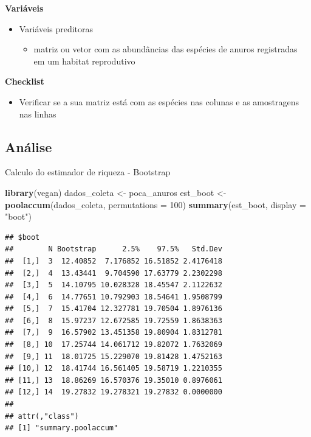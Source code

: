 \documentclass[
]{book}
\newenvironment{Shaded}{\begin{snugshade}}{\end{snugshade}}
\newcommand{\DataTypeTok}[1]{\textcolor[rgb]{0.13,0.29,0.53}{#1}}
\newcommand{\DecValTok}[1]{\textcolor[rgb]{0.00,0.00,0.81}{#1}}
\newcommand{\KeywordTok}[1]{\textcolor[rgb]{0.13,0.29,0.53}{\textbf{#1}}}
\newcommand{\NormalTok}[1]{#1}
\newcommand{\StringTok}[1]{\textcolor[rgb]{0.31,0.60,0.02}{#1}}
\providecommand{\tightlist}{%
  \setlength{\itemsep}{0pt}\setlength{\parskip}{0pt}}
\begin{document}
\textbf{Variáveis}

\begin{itemize}
\tightlist
\item
  Variáveis preditoras

  \begin{itemize}
  \tightlist
  \item
    matriz ou vetor com as abundâncias das espécies de anuros registradas em um habitat reprodutivo
  \end{itemize}
\end{itemize}

\textbf{Checklist}

\begin{itemize}
\tightlist
\item
  Verificar se a sua matriz está com as espécies nas colunas e as amostragens nas linhas
\end{itemize}

\hypertarget{anuxe1lise-5}{%
\subsection{Análise}\label{anuxe1lise-5}}

Calculo do estimador de riqueza - Bootstrap

\begin{Shaded}
\begin{Highlighting}[]
\KeywordTok{library}\NormalTok{(vegan)}
\NormalTok{dados_coleta <-}\StringTok{ }\NormalTok{poca_anuros}
\NormalTok{est_boot <-}\StringTok{ }\KeywordTok{poolaccum}\NormalTok{(dados_coleta, }\DataTypeTok{permutations =} \DecValTok{100}\NormalTok{)}
\KeywordTok{summary}\NormalTok{(est_boot, }\DataTypeTok{display =} \StringTok{"boot"}\NormalTok{)}
\end{Highlighting}
\end{Shaded}

\begin{verbatim}
## $boot
##        N Bootstrap      2.5%    97.5%   Std.Dev
##  [1,]  3  12.40852  7.176852 16.51852 2.4176418
##  [2,]  4  13.43441  9.704590 17.63779 2.2302298
##  [3,]  5  14.10795 10.028328 18.45547 2.1122632
##  [4,]  6  14.77651 10.792903 18.54641 1.9508799
##  [5,]  7  15.41704 12.327781 19.70504 1.8976136
##  [6,]  8  15.97237 12.672585 19.72559 1.8638363
##  [7,]  9  16.57902 13.451358 19.80904 1.8312781
##  [8,] 10  17.25744 14.061712 19.82072 1.7632069
##  [9,] 11  18.01725 15.229070 19.81428 1.4752163
## [10,] 12  18.41744 16.561405 19.58719 1.2210355
## [11,] 13  18.86269 16.570376 19.35010 0.8976061
## [12,] 14  19.27832 19.278321 19.27832 0.0000000
## 
## attr(,"class")
## [1] "summary.poolaccum"
\end{verbatim}
\end{document}
